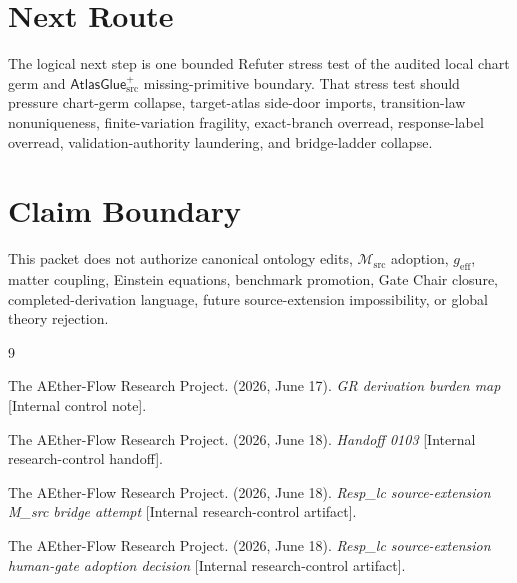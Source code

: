 \documentclass[11pt]{article}
\newcommand{\Msrc}{\mathcal{M}_{\mathrm{src}}}
\newcommand{\geff}{g_{\mathrm{eff}}}
\newcommand{\AtlasGlue}{\mathsf{AtlasGlue}_{\mathrm{src}}^{+}}
\begin{document}
\section{Next Route}

The logical next step is one bounded Refuter stress test of the audited local
chart germ and \(\AtlasGlue\) missing-primitive boundary. That stress test
should pressure chart-germ collapse, target-atlas side-door imports,
transition-law nonuniqueness, finite-variation fragility, exact-branch
overread, response-label overread, validation-authority laundering, and
bridge-ladder collapse.

\section{Claim Boundary}

This packet does not authorize canonical ontology edits, \(\Msrc\) adoption,
\(\geff\), matter coupling, Einstein equations, benchmark promotion, Gate Chair
closure, completed-derivation language, future source-extension impossibility,
or global theory rejection.

\begin{thebibliography}{9}

The AEther-Flow Research Project. (2026, June 17). \emph{GR derivation burden
map} [Internal control note].

The AEther-Flow Research Project. (2026, June 18). \emph{Handoff 0103}
[Internal research-control handoff].

The AEther-Flow Research Project. (2026, June 18). \emph{Resp\_lc
source-extension M\_src bridge attempt} [Internal research-control artifact].

The AEther-Flow Research Project. (2026, June 18). \emph{Resp\_lc
source-extension human-gate adoption decision} [Internal research-control
artifact].

\end{thebibliography}
\end{document}
